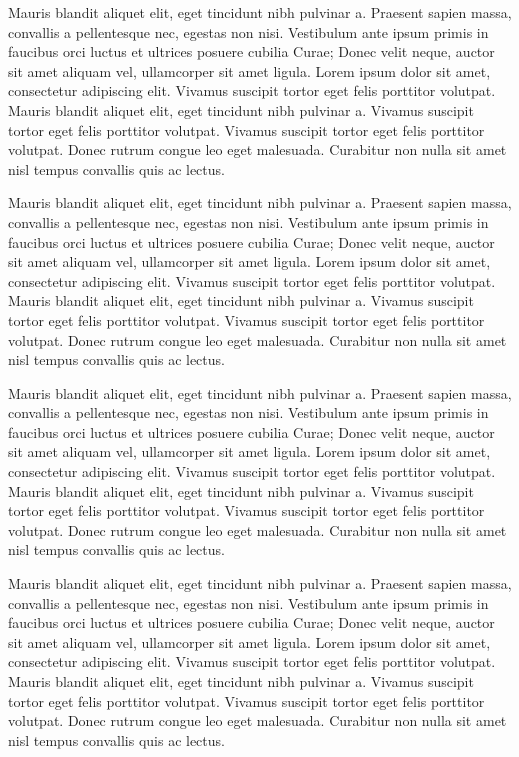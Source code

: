 \documentclass{scrbook}
\begin{document}
Mauris blandit aliquet elit, eget tincidunt nibh pulvinar a. Praesent
sapien massa, convallis a pellentesque nec, egestas non nisi. Vestibulum
ante ipsum primis in faucibus orci luctus et ultrices posuere cubilia
Curae; Donec velit neque, auctor sit amet aliquam vel, ullamcorper sit
amet ligula. Lorem ipsum dolor sit amet, consectetur adipiscing elit.
Vivamus suscipit tortor eget felis porttitor volutpat. Mauris blandit
aliquet elit, eget tincidunt nibh pulvinar a. Vivamus suscipit tortor
eget felis porttitor volutpat. Vivamus suscipit tortor eget felis
porttitor volutpat. Donec rutrum congue leo eget malesuada. Curabitur
non nulla sit amet nisl tempus convallis quis ac lectus.

Mauris blandit aliquet elit, eget tincidunt nibh pulvinar a. Praesent
sapien massa, convallis a pellentesque nec, egestas non nisi. Vestibulum
ante ipsum primis in faucibus orci luctus et ultrices posuere cubilia
Curae; Donec velit neque, auctor sit amet aliquam vel, ullamcorper sit
amet ligula. Lorem ipsum dolor sit amet, consectetur adipiscing elit.
Vivamus suscipit tortor eget felis porttitor volutpat. Mauris blandit
aliquet elit, eget tincidunt nibh pulvinar a. Vivamus suscipit tortor
eget felis porttitor volutpat. Vivamus suscipit tortor eget felis
porttitor volutpat. Donec rutrum congue leo eget malesuada. Curabitur
non nulla sit amet nisl tempus convallis quis ac lectus.

Mauris blandit aliquet elit, eget tincidunt nibh pulvinar a. Praesent
sapien massa, convallis a pellentesque nec, egestas non nisi. Vestibulum
ante ipsum primis in faucibus orci luctus et ultrices posuere cubilia
Curae; Donec velit neque, auctor sit amet aliquam vel, ullamcorper sit
amet ligula. Lorem ipsum dolor sit amet, consectetur adipiscing elit.
Vivamus suscipit tortor eget felis porttitor volutpat. Mauris blandit
aliquet elit, eget tincidunt nibh pulvinar a. Vivamus suscipit tortor
eget felis porttitor volutpat. Vivamus suscipit tortor eget felis
porttitor volutpat. Donec rutrum congue leo eget malesuada. Curabitur
non nulla sit amet nisl tempus convallis quis ac lectus.

Mauris blandit aliquet elit, eget tincidunt nibh pulvinar a. Praesent
sapien massa, convallis a pellentesque nec, egestas non nisi. Vestibulum
ante ipsum primis in faucibus orci luctus et ultrices posuere cubilia
Curae; Donec velit neque, auctor sit amet aliquam vel, ullamcorper sit
amet ligula. Lorem ipsum dolor sit amet, consectetur adipiscing elit.
Vivamus suscipit tortor eget felis porttitor volutpat. Mauris blandit
aliquet elit, eget tincidunt nibh pulvinar a. Vivamus suscipit tortor
eget felis porttitor volutpat. Vivamus suscipit tortor eget felis
porttitor volutpat. Donec rutrum congue leo eget malesuada. Curabitur
non nulla sit amet nisl tempus convallis quis ac lectus.
\end{document}
